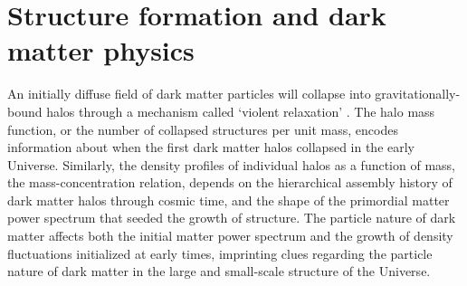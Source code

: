 \section{Structure formation and dark matter physics}
\indent An initially diffuse field of dark matter particles will collapse into gravitationally-bound halos through a mechanism called `violent relaxation' \cite{LyndenBell67}. The halo mass function, or the number of collapsed structures per unit mass, encodes information about when the first dark matter halos collapsed in the early Universe. Similarly, the density profiles of individual halos as a function of mass, the mass-concentration relation, depends on the hierarchical assembly history of dark matter halos through cosmic time, and the shape of the primordial matter power spectrum that seeded the growth of structure. The particle nature of dark matter affects both the initial matter power spectrum and the growth of density fluctuations initialized at early times, imprinting clues regarding the particle nature of dark matter in the large and small-scale structure of the Universe. 

